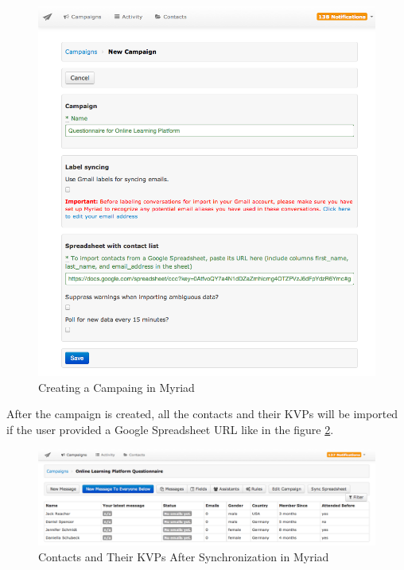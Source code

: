\begin{figure}[htbp]
	\centering
	\includegraphics[width=1.00\textwidth]{imgs/CreateCampaign.png}
	\caption[Creating a Campaing in Myriad]{Creating a Campaing in Myriad}
	\label{fig:CreateCampaign}
\end{figure}

After the campaign is created, all the contacts and their \ac{KVP}s will be imported if the user provided a Google Spreadsheet \ac{URL} like in the figure \ref{fig:ContactListInCampaign}.

\begin{figure}[htbp]
	\centering
	\includegraphics[width=1.00\textwidth]{imgs/ContactListInCampaign.png}
	\caption[Contacts and Their \ac{KVP}s After Synchronization in Myriad]{Contacts and Their \ac{KVP}s After Synchronization in Myriad}
	\label{fig:ContactListInCampaign}
\end{figure}


